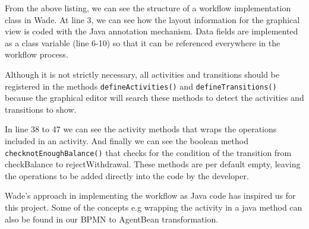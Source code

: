 From the above listing, we can see the structure of a workflow implementation class in Wade. At line 3, we can see how the layout information for the graphical view is coded with the Java annotation mechanism. Data fields are implemented as a class variable (line 6-10) so that it can be referenced everywhere in the workflow process. 

Although it is not strictly necessary, all activities and transitions should be registered in the methods \verb|defineActivities()| and \verb|defineTransitions()| because the graphical editor will search these methods to detect the activities and transitions to show.

In line 38 to 47 we can see the activity methods that wraps the operations included in an activity. And finally we can see the boolean method  \verb|checknotEnoughBalance()| that checks for the condition of the transition from checkBalance to rejectWithdrawal. These methods are per default empty, leaving the operations to be added directly into the code by the developer.

Wade's approach in implementing the workflow as Java code has inspired us for this project. Some of the concepts e.g wrapping the activity in a java method can also be found in our BPMN to AgentBean transformation. 